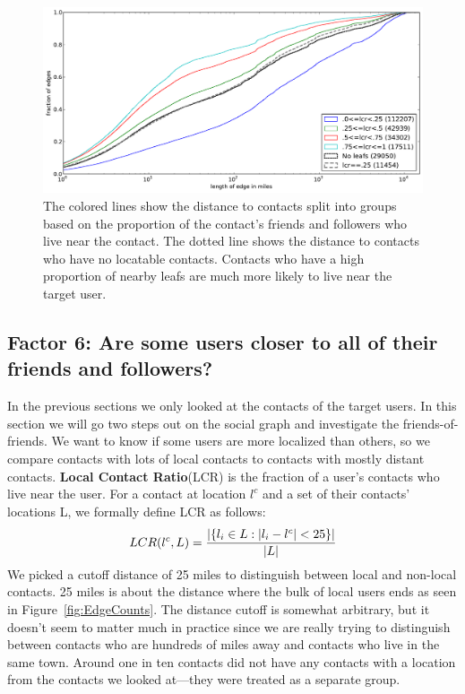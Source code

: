 \documentclass{sig-alternate}
\begin{document}
\begin{figure}[tb]
\centering
\includegraphics[width=.9\linewidth]{figures/locals_10.pdf}
\caption{
The colored lines show the distance to contacts split into groups based on the
proportion of the contact's friends and followers who live near the contact.
The dotted line shows the distance to contacts who have no locatable contacts.
Contacts who have a high proportion of nearby leafs are much more likely to
live near the target user.
}
\label{fig:Local10}
\vspace{-2pt}
\end{figure}


\subsection{Factor 6: Are some users closer to all of their friends and followers?}
\label{sec:closer}

In the previous sections we only looked at the contacts of the target
users.
%
In this section we will go two steps out on the social graph and
investigate the friends-of-friends.
%
We want to know if some users are more localized than others, so we compare
contacts with lots of local contacts to contacts with mostly distant contacts.
%
\textbf{Local Contact Ratio}(LCR) is the fraction of a user's contacts
who live near the user.
%
For a contact at location $l^c$ and a set of their contacts' locations L, we
formally define LCR as follows:
\[
    LCR(l^c,L) = { |\{ l_i \in L : |l_i-l^c|<25 \}|
                    \over |L| }
\]
%
We picked a cutoff distance of 25 miles to distinguish between local and non-local
contacts.
25 miles is about the distance where the bulk of local users ends as seen in
Figure~\ref{fig:EdgeCounts}.
%
The distance cutoff is somewhat arbitrary, but it doesn't seem to matter much
in practice since we are really trying to distinguish between contacts who are
hundreds of miles away and contacts who live in the same town.
%
Around one in ten contacts did not have any contacts with a location from the
contacts we looked at---they were treated as a separate group.
\end{document}
